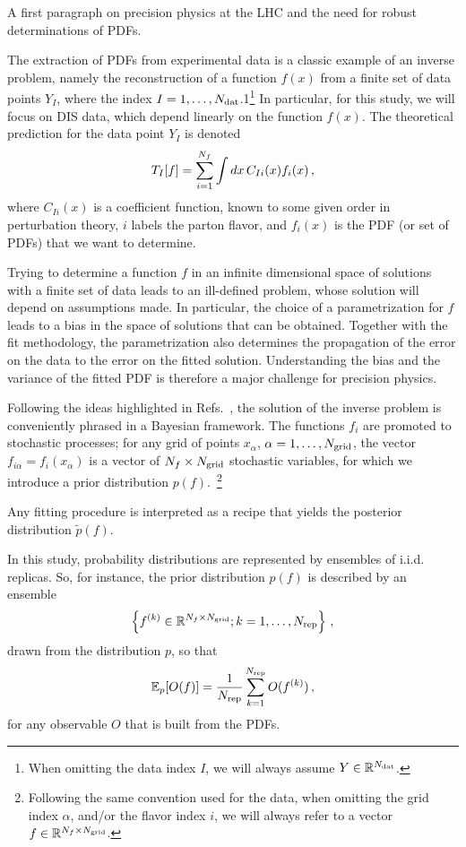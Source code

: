 

A first paragraph on precision physics at the LHC and the need for robust determinations of PDFs.

The extraction of PDFs from experimental data is a classic example of an inverse problem,
namely the reconstruction of a function $f(x)$ from a finite set of data points
$Y_I$, where the index $I=1, \ldots, N_{\mathrm{dat}}$.1\footnote{When omitting the data index $I$, we will always
assume $Y \in \mathbb{R}^{N_{\mathrm{dat}}}$.} In particular, for this study, we will focus
on DIS data, which depend
linearly on the function $f(x)$. The theoretical prediction for the data point $Y_I$ is denoted
\begin{equation}
    \label{eq:TheoryPred}
    T_I[f] = \sum_{i=1}^{N_{f}} \int dx\, C_{Ii}(x) f_{i}(x)\, ,
\end{equation}
where $C_{Ii}(x)$ is a coefficient function, known to some given order in perturbation theory,
$i$ labels the parton flavor, and $f_i(x)$
is the PDF (or set of PDFs) that we want to determine.

Trying to determine a function $f$ in an infinite dimensional space of solutions with a finite
set of data leads to an ill-defined problem, whose solution will depend on assumptions made.
In particular, the choice of a parametrization for $f$ leads to a bias in the space
of solutions that can be obtained. Together with the fit methodology, the parametrization also
determines the propagation of the error on the data to the error on the fitted solution. Understanding
the bias and the variance of the fitted PDF is therefore a major challenge for precision physics.

Following the ideas highlighted in Refs.~\cite{DelDebbio:2021whr,Candido:2024hjt}, the solution
of the inverse problem is conveniently phrased in
a Bayesian framework. The functions $f_i$ are promoted to stochastic processes; for any grid
of points $x_{\alpha}$, $\alpha=1, \ldots, N_{\mathrm{grid}}$, the vector $f_{i\alpha}=f_{i}(x_{\alpha})$ is a
vector of $N_{f}\times N_{\mathrm{grid}}$ stochastic variables, for which we introduce a prior distribution $p(f)$.~\footnote{Following
the same convention used for the data, when omitting the grid index $\alpha$, and/or the flavor index $i$, we will always refer to a
vector $f \in \mathbb{R}^{N_{f}\times N_{\mathrm{grid}}}$.}

Any fitting procedure is interpreted as a recipe that yields the posterior distribution
$\tilde{p}(f)$.

In this study, probability distributions are represented by ensembles of i.i.d. replicas.
So, for instance, the prior distribution $p(f)$ is described by an ensemble
\begin{equation}
    \label{eq:RepDef}
    \left\{f^{(k)} \in \mathbb{R}^{N_{f}\times N_{\mathrm{grid}}}; k=1, \ldots, N_{\rm rep}\right\}\, ,
\end{equation}
drawn from the distribution $p$, so that
\begin{equation}
    \label{eq:ReplicaEnsemble}
    \mathbb{E}_{p}[O(f)] = \frac{1}{N_{\rm rep}} \sum_{k=1}^{N_{\rm rep}} O(f^{(k)})\, ,
\end{equation}
for any observable $O$ that is built from the PDFs.

